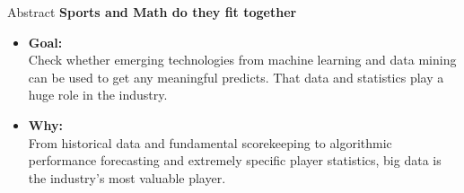 \begin{frame}{Abstract}
    \textbf{Sports and Math do they fit together}
    \vspace{2em}
    \begin{itemize}
        \item \textbf{Goal:}\\
            Check whether emerging technologies from machine learning and data mining can be used to get any meaningful predicts. That data and statistics play a huge role in the industry.
            
        \item \textbf{Why:}\\
            From historical data and fundamental scorekeeping to algorithmic performance forecasting and extremely specific player statistics, big data is the industry’s most valuable player.
    \end{itemize}
\end{frame} 
